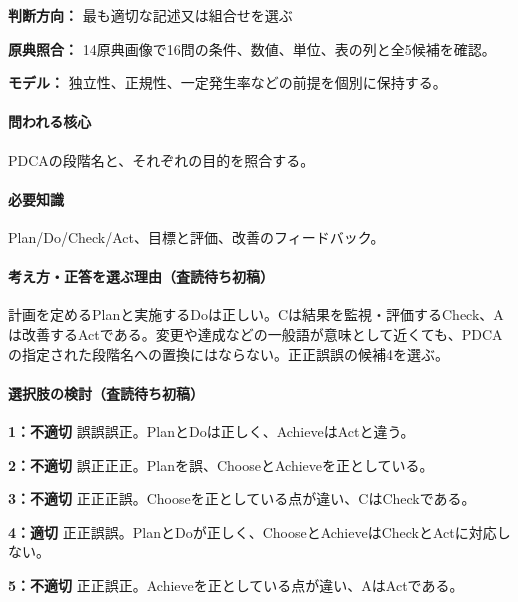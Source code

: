 \noindent\textbf{判断方向：} 最も適切な記述又は組合せを選ぶ\par

\noindent\textbf{原典照合：} 14原典画像で16問の条件、数値、単位、表の列と全5候補を確認。\par

\noindent\textbf{モデル：} 独立性、正規性、一定発生率などの前提を個別に保持する。\par

\paragraph{問われる核心} PDCAの段階名と、それぞれの目的を照合する。

\paragraph{必要知識} Plan/Do/Check/Act、目標と評価、改善のフィードバック。

\paragraph{考え方・正答を選ぶ理由（査読待ち初稿）} 計画を定めるPlanと実施するDoは正しい。Cは結果を監視・評価するCheck、Aは改善するActである。変更や達成などの一般語が意味として近くても、PDCAの指定された段階名への置換にはならない。正正誤誤の候補4を選ぶ。

\paragraph{選択肢の検討（査読待ち初稿）}\mbox{}\par

\noindent\textbf{1：不適切} 誤誤誤正。PlanとDoは正しく、AchieveはActと違う。\par

\noindent\textbf{2：不適切} 誤正正正。Planを誤、ChooseとAchieveを正としている。\par

\noindent\textbf{3：不適切} 正正正誤。Chooseを正としている点が違い、CはCheckである。\par

\noindent\textbf{4：適切} 正正誤誤。PlanとDoが正しく、ChooseとAchieveはCheckとActに対応しない。\par

\noindent\textbf{5：不適切} 正正誤正。Achieveを正としている点が違い、AはActである。\par

